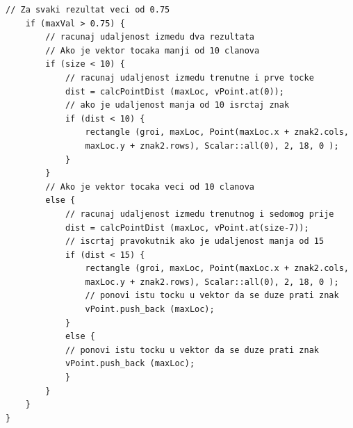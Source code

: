 \newpage
\begin{lstlisting}[label=lstFP2,caption={Izvorni kod eliminacije
lažno pozitivnih rezultata}]
    // Za svaki rezultat veci od 0.75 
    if (maxVal > 0.75) {
        // racunaj udaljenost izmedu dva rezultata
        // Ako je vektor tocaka manji od 10 clanova
        if (size < 10) {
            // racunaj udaljenost izmedu trenutne i prve tocke
            dist = calcPointDist (maxLoc, vPoint.at(0));
            // ako je udaljenost manja od 10 isrctaj znak
            if (dist < 10) {
                rectangle (groi, maxLoc, Point(maxLoc.x + znak2.cols, 
                maxLoc.y + znak2.rows), Scalar::all(0), 2, 18, 0 );
            }
        }
        // Ako je vektor tocaka veci od 10 clanova
        else {
            // racunaj udaljenost izmedu trenutnog i sedomog prije 
            dist = calcPointDist (maxLoc, vPoint.at(size-7));  
            // iscrtaj pravokutnik ako je udaljenost manja od 15 
            if (dist < 15) {
                rectangle (groi, maxLoc, Point(maxLoc.x + znak2.cols, 
                maxLoc.y + znak2.rows), Scalar::all(0), 2, 18, 0 );
                // ponovi istu tocku u vektor da se duze prati znak
                vPoint.push_back (maxLoc);  
            }
            else {
            // ponovi istu tocku u vektor da se duze prati znak
            vPoint.push_back (maxLoc);
            }
        }
    }
}
\end{lstlisting}

